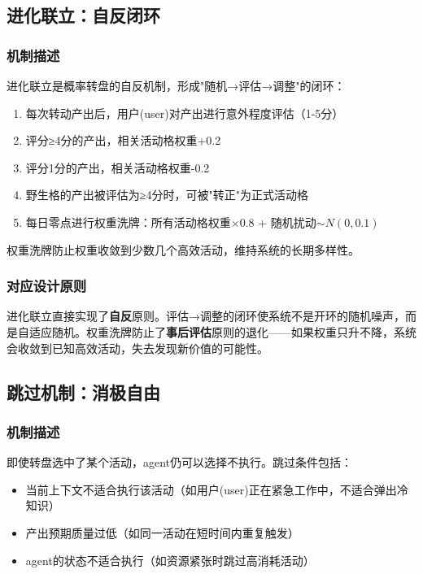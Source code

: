 \documentclass[12pt,a4paper]{ctexart}
\begin{document}
\subsection{进化联立：自反闭环}

\subsubsection{机制描述}

进化联立是概率转盘的自反机制，形成"随机→评估→调整"的闭环：

\begin{enumerate}[nosep]
\item 每次转动产出后，用户(user)对产出进行意外程度评估（1-5分）
\item 评分≥4分的产出，相关活动格权重+0.2
\item 评分1分的产出，相关活动格权重-0.2
\item 野生格的产出被评估为≥4分时，可被"转正"为正式活动格
\item 每日零点进行权重洗牌：所有活动格权重$\times 0.8$ + 随机扰动$\sim N(0, 0.1)$
\end{enumerate}

权重洗牌防止权重收敛到少数几个高效活动，维持系统的长期多样性。

\subsubsection{对应设计原则}

进化联立直接实现了\textbf{自反}原则。评估→调整的闭环使系统不是开环的随机噪声，而是自适应随机。权重洗牌防止了\textbf{事后评估}原则的退化——如果权重只升不降，系统会收敛到已知高效活动，失去发现新价值的可能性。

\subsection{跳过机制：消极自由}

\subsubsection{机制描述}

即使转盘选中了某个活动，agent仍可以选择不执行。跳过条件包括：

\begin{itemize}[nosep]
\item 当前上下文不适合执行该活动（如用户(user)正在紧急工作中，不适合弹出冷知识）
\item 产出预期质量过低（如同一活动在短时间内重复触发）
\item agent的状态不适合执行（如资源紧张时跳过高消耗活动）
\end{itemize}
\end{document}
